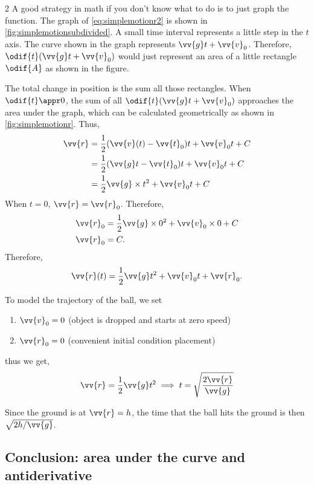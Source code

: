 \begin{multicols}{2}
	A good strategy in math if you don't know what to do is to just graph the function. The graph of \cref{eq:simplemotionr2} is shown in \cref{fig:simplemotionsubdivided}. A small time interval represents a little step in the $t$ axis. The curve shown in the graph represents $\vv{g}t + \vv{v}_0$. Therefore, $\odif{t}(\vv{g}t + \vv{v}_0)$ would just represent an area of a little rectangle $\odif{A}$ as shown in the figure.

	The total change in position is the sum all those rectangles. When $\odif{t} \appr 0$, the sum of all $\odif{t}(\vv{g}t + \vv{v}_0)$ approaches the area under the graph, which can be calculated geometrically as shown in \cref{fig:simplemotionr}. Thus,
	\begin{align}
		\vv{r} & = \frac{1}{2}(\vv{v}(t) - \vv{t}_0)t + \vv{v}_0t + C \\
		       & = \frac{1}{2}(\vv{g}t - \vv{t}_0)t + \vv{v}_0t + C   \\
		       & = \frac{1}{2}\vv{g}\times t^2 + \vv{v}_0t + C
	\end{align}
	When $t = 0$, $\vv{r} = \vv{r}_0$. Therefore,
	\begin{align*}
		\vv{r}_0 & = \frac{1}{2}\vv{g}\times 0^2 + \vv{v}_0\times 0 + C \\
		\vv{r}_0 & = C.
	\end{align*}
	Therefore,
	\begin{equation}
		\vv{r}(t) = \frac{1}{2}\vv{g}t^2 + \vv{v}_0t + \vv{r}_0.
	\end{equation}

	To model the trajectory of the ball, we set
	\begin{enumerate}[noitemsep]
		\item $\vv{v}_0 = 0$ (object is dropped and starts at zero speed)
		\item $\vv{r}_0 = 0$ (convenient initial condition placement)
	\end{enumerate}
	thus we get,
	\begin{gather}
		\vv{r} = \frac{1}{2}\vv{g}t^2 \implies t = \sqrt{\frac{2\vv{r}}{\vv{g}}}
	\end{gather}
\end{multicols}
Since the ground is at $\vv{r} = h$, the time that the ball hits the ground is then $\sqrt{2h/\vv{g}}$.

\subsection{Conclusion: area under the curve and antiderivative}

